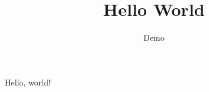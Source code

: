 \documentclass{article}
\title{Hello World}
\author{Demo}
\date{}
\begin{document}
\maketitle


Hello, world!


\end{document}
